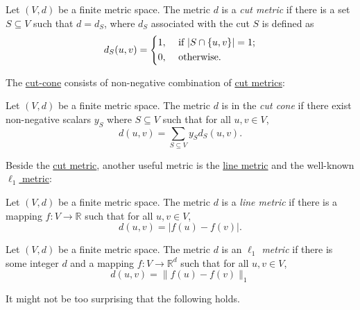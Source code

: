 \begin{definition}\label{def:cut-metric}
	Let \((V, d)\) be a finite metric space. The metric \(d\) is a \emph{cut metric} if there is a set \(S \subseteq V\) such that \(d = d_S\), where \(d_S\) associated with the cut \(S\) is defined as
	\[
		d_S(u, v)
		= \begin{dcases}
			1, & \text{ if } \lvert S \cap \{ u, v \}  \rvert = 1 ; \\
			0, & \text{ otherwise} .
		\end{dcases}
	\]
\end{definition}

The \hyperref[def:cut-cone]{cut-cone} consists of non-negative combination of \hyperref[def:cut-metric]{cut metrics}:

\begin{definition}\label{def:cut-cone}
	Let \((V, d)\) be a finite metric space. The metric \(d\) is in the \emph{cut cone} if there exist non-negative scalars \(y_S\) where \(S \subseteq V\) such that for all \(u, v \in V\),
	\[
		d(u, v)
		= \sum_{S \subseteq V} y_S d_S(u, v).
	\]
\end{definition}

Beside the \hyperref[def:cut-metric]{cut metric}, another useful metric is the \hyperref[def:line-metric]{line metric} and the well-known \hyperref[def:l1-metric]{\(\ell _1\) metric}:

\begin{definition}\label{def:line-metric}
	Let \((V, d)\) be a finite metric space. The metric \(d\) is a \emph{line metric} if there is a mapping \(f \colon V \to \mathbb{R} \) such that for all \(u, v \in V\),
	\[
		d(u, v)
		= \lvert f(u) - f(v) \rvert .
	\]
\end{definition}

\begin{definition}\label{def:l1-metric}
	Let \((V, d)\) be a finite metric space. The metric \(d\) is an \emph{\(\ell _1\) metric} if there is some integer \(d\) and a mapping \(f \colon V \to \mathbb{R} ^d\) such that for all \(u, v \in V\),
	\[
		d(u, v)
		= \lVert f(u) - f(v) \rVert _1
	\]
\end{definition}

It might not be too surprising that the following holds.

